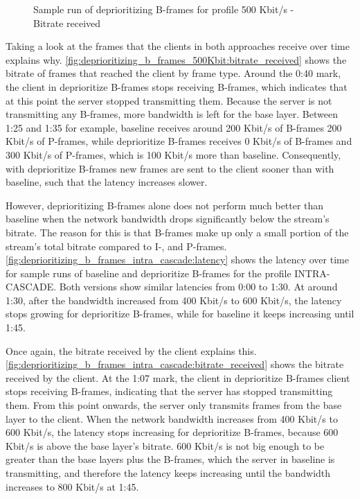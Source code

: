 \begin{figure}
    \centering
    
    \caption{Sample run of deprioritizing B-frames for profile 500 Kbit/s - Bitrate received}
    \label{fig:deprioritizing_b_frames_500Kbit:bitrate_received}
\end{figure}

Taking a look at the frames that the clients in both approaches receive over time explains why.
\autoref{fig:deprioritizing_b_frames_500Kbit:bitrate_received} shows the bitrate of frames that reached the client
by frame type. Around the 0:40 mark, the client in deprioritize B-frames stops receiving B-frames,
which indicates that at this point the server stopped transmitting them. Because the server is not transmitting any
B-frames, more bandwidth is left for the base layer. Between 1:25
and 1:35 for example, baseline receives around 200 Kbit/s of B-frames 200 Kbit/s of P-frames, while deprioritize
B-frames receives 0 Kbit/s of B-frames and 300 Kbit/s of P-frames, which is 100 Kbit/s more than baseline.
Consequently, with deprioritize B-frames new frames are sent to the client sooner than with baseline,
such that the latency increases slower.

However, deprioritizing B-frames alone does not perform much better than baseline when the network bandwidth drops significantly
below the stream's bitrate. The reason for this is that B-frames make up only a small portion of the stream's total bitrate
compared to I-, and P-frames. \autoref{fig:deprioritizing_b_frames_intra_cascade:latency} shows the latency over time for
sample runs of baseline and deprioritize B-frames for the profile INTRA-CASCADE. Both versions show similar latencies
from 0:00 to 1:30. At around 1:30, after the bandwidth increased from 400 Kbit/s to 600 Kbit/s, the latency
stops growing for deprioritize B-frames, while for baseline it keeps increasing until 1:45.


Once again, the bitrate received by the client explains this.
\autoref{fig:deprioritizing_b_frames_intra_cascade:bitrate_received} shows the bitrate received by the client.
At the 1:07 mark, the client in deprioritize B-frames client stops receiving B-frames, indicating that the server has stopped
transmitting them. From this point onwards, the server only transmits frames from the base layer to the client.
When the network bandwidth increases from 400 Kbit/s to 600 Kbit/s, the latency stops increasing for deprioritize B-frames,
because 600 Kbit/s is above the base layer's bitrate. %
600 Kbit/s is not big enough to be greater than the base layers plus the B-frames, which the server in baseline is transmitting, and therefore the latency keeps increasing until the bandwidth increases to 800 Kbit/s at 1:45. 

